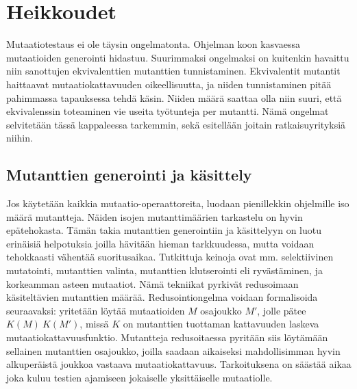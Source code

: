 \documentclass{tktltiki}
\begin{document}
\section{Heikkoudet}
Mutaatiotestaus ei ole täysin ongelmatonta. Ohjelman koon kasvaessa mutaatioiden generointi hidastuu. Suurimmaksi ongelmaksi on kuitenkin havaittu niin sanottujen ekvivalenttien mutanttien tunnistaminen. Ekvivalentit mutantit haittaavat mutaatiokattavuuden oikeellisuutta, ja niiden tunnistaminen pitää pahimmassa tapauksessa tehdä käsin. Niiden määrä saattaa olla niin suuri, että ekvivalenssin toteaminen vie useita työtunteja per mutantti. Nämä ongelmat selvitetään tässä kappaleessa tarkemmin, sekä esitellään joitain ratkaisuyrityksiä niihin.

\subsection{Mutanttien generointi ja käsittely}
Jos käytetään kaikkia mutaatio-operaattoreita, luodaan pienillekkin ohjelmille iso määrä mutantteja. Näiden isojen mutanttimäärien tarkastelu on hyvin epätehokasta. Tämän takia mutanttien generointiin ja käsittelyyn on luotu erinäisiä helpotuksia joilla hävitään hieman tarkkuudessa, mutta voidaan tehokkaasti vähentää suoritusaikaa. Tutkittuja keinoja ovat mm. selektiivinen mutatointi, mutanttien valinta, mutanttien klutserointi eli ryvästäminen, ja korkeamman asteen mutaatiot. Nämä tekniikat pyrkivät redusoimaan käsiteltävien mutanttien määrää. Redusointiongelma voidaan formalisoida seuraavaksi: yritetään löytää mutaatioiden $M$ osajoukko $M'$, jolle pätee $K(M) ~ K(M')$, missä $K$ on mutanttien tuottaman kattavuuden laskeva mutaatiokattavuusfunktio. Mutantteja redusoitaessa pyritään siis löytämään sellainen mutanttien osajoukko, joilla saadaan aikaiseksi mahdollisimman hyvin alkuperäistä joukkoa vastaava mutaatiokattavuus. Tarkoituksena on säästää aikaa joka kuluu testien ajamiseen jokaiselle yksittäiselle mutaatiolle.
\end{document}
